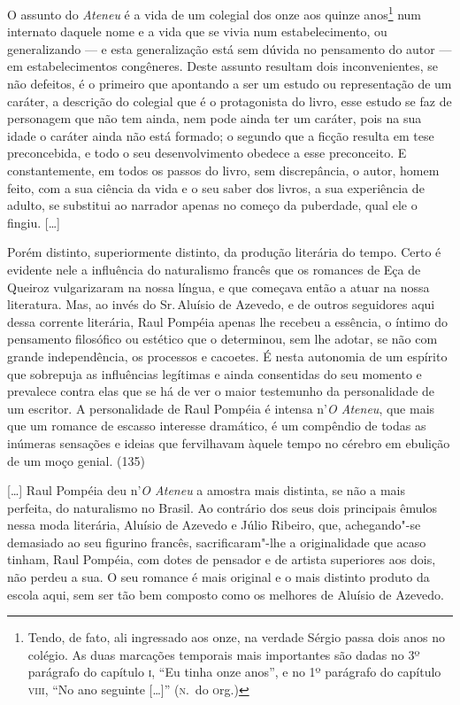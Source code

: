 O assunto do \textit{Ateneu}
é a vida de um colegial dos onze aos quinze anos\footnote{Tendo, de
fato, ali ingressado aos onze, na verdade Sérgio passa dois anos no
colégio. As duas marcações temporais mais importantes são dadas no
3º parágrafo do capítulo \textsc{i}, ``Eu tinha onze anos'', e
no 1º parágrafo do capítulo \textsc{viii}, ``No ano
seguinte [\ldots]'' (\textsc{n}.~do \textsc{o}rg.)} num internato daquele nome
e a vida que se vivia num estabelecimento, ou generalizando --- e esta
generalização está sem dúvida no pensamento do autor --- em
estabelecimentos congêneres. Deste assunto resultam dois
inconvenientes, se não defeitos, é o primeiro que apontando a ser um
estudo ou representação de um caráter, a descrição do colegial que é o
protagonista do livro, esse estudo se faz de personagem que não tem
ainda, nem pode ainda ter um caráter, pois na sua idade o caráter ainda
não está formado; o segundo que a ficção resulta em tese preconcebida,
e todo o seu desenvolvimento obedece a esse preconceito. E
constantemente, em todos os passos do livro, sem discrepância, o autor,
homem feito, com a sua ciência da vida e o seu saber dos livros, a sua
experiência de adulto, se substitui ao narrador apenas no começo da
puberdade, qual ele o fingiu.
[\ldots] 

Porém distinto, superiormente distinto, da produção
literária do tempo. Certo é evidente nele a influência do naturalismo
francês que os romances de Eça de Queiroz vulgarizaram na nossa língua,
e que começava então a atuar na nossa literatura. Mas, ao invés do Sr.\,Aluísio de Azevedo, e de outros seguidores aqui dessa corrente
literária, Raul Pompéia apenas lhe recebeu a essência, o íntimo do
pensamento filosófico ou estético que o determinou, sem lhe adotar, se
não com grande independência, os processos e cacoetes. É nesta
autonomia de um espírito que sobrepuja as influências legítimas e ainda
consentidas do seu momento e prevalece contra elas que se há de ver o
maior testemunho da personalidade de um escritor. A personalidade de
Raul Pompéia é intensa n'\textit{O Ateneu},
que mais que um romance de escasso interesse dramático, é um compêndio
de todas as inúmeras sensações e ideias que fervilhavam àquele tempo no
cérebro em ebulição de um moço genial.  (135)


\smallskip

[\ldots] Raul Pompéia deu n'\textit{O Ateneu} a amostra mais distinta, se não a mais
perfeita, do naturalismo no Brasil. Ao contrário dos seus dois
principais êmulos nessa moda literária, Aluísio de Azevedo e Júlio
Ribeiro, que, achegando"-se demasiado ao seu figurino francês,
sacrificaram"-lhe a originalidade que acaso tinham, Raul Pompéia, com
dotes de pensador e de artista superiores aos dois, não perdeu a sua. O
seu romance é mais original e o mais distinto produto da escola aqui,
sem ser tão bem composto como os melhores de Aluísio de Azevedo. 

